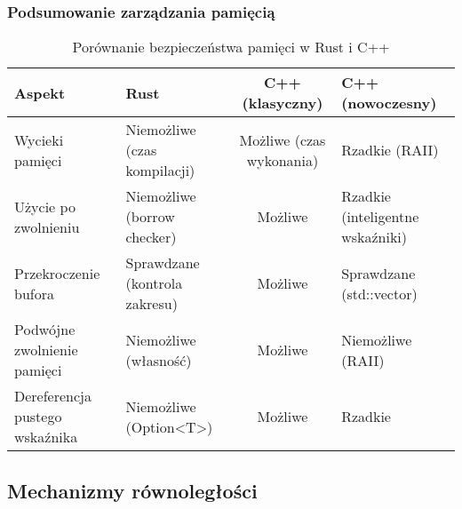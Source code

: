 \subsubsection{Podsumowanie zarządzania pamięcią}
\begin{table}[H]
    \centering
    \caption{Porównanie bezpieczeństwa pamięci w Rust i C++}
    \begin{tabular}{|>{\centering}m{3cm}|>{\centering}m{3cm}|c|>{\centering\arraybackslash}m{3.5cm}|}
    \hline
    \textbf{Aspekt} & \textbf{Rust} & \textbf{C++ (klasyczny)} & \textbf{C++ (nowoczesny)} \\
    \hline
    Wycieki pamięci & Niemożliwe (czas kompilacji) & Możliwe (czas wykonania) & Rzadkie (RAII) \\ \hline
    Użycie po zwolnieniu & Niemożliwe (borrow checker) & Możliwe & Rzadkie (inteligentne wskaźniki) \\ \hline
    Przekroczenie bufora & Sprawdzane (kontrola zakresu) & Możliwe & Sprawdzane (std::vector) \\ \hline
    Podwójne zwolnienie pamięci & Niemożliwe (własność) & Możliwe & Niemożliwe (RAII) \\ \hline
    Dereferencja pustego wskaźnika & Niemożliwe (Option\textless T\textgreater) & Możliwe & Rzadkie \\
    \hline
    \end{tabular}

\end{table}

\subsection{Mechanizmy równoległości}

